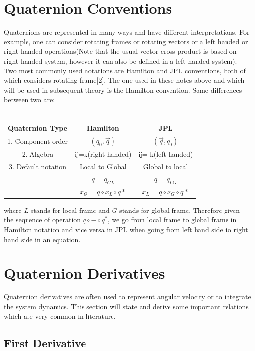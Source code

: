 \documentclass{article}
\begin{document}
	
	\section{Quaternion Conventions}
	Quaternions are represented in many ways and have different interpretations. For example, one can consider rotating frames or rotating vectors or a left handed or right handed operations(Note that the usual vector cross product is based on right handed system, however it can also be defined in a left handed system). Two most commonly used notations are Hamilton and JPL conventions, both of which considers rotating frame[2]. The one used in these notes above and which will be used in subsequent theory is the Hamilton convention. Some differences between two are:\\ \\
	
	\begin{table}
		\centering
		\begin{tabular}{c|c|c}
			Quaternion Type & Hamilton & JPL \\
			\hline
			1. Component order & $ (q_0,\vec{q}) $ & $ (\vec{q},q_0) $\\
			2. Algebra & ij=k(right handed) & ij=-k(left handed)\\
			3. Default notation & Local to Global & Global to local \\
			  & $ q = q_{GL} $ & $ q=q_{LG} $ \\
			  & $ x_G = q\circ x_L\circ q* $ &$  x_L = q\circ x_G \circ q* $\\
			  \hline
		\end{tabular}
	\end{table}
	where $L$ stands for local frame and $G$ stands for global frame. Therefore given the sequence of operation $q\circ - \circ q^*$, we go from local frame to global frame in Hamilton notation and vice versa in JPL when going from left hand side to right hand side in an equation. 
	
	\section{Quaternion Derivatives}
	
	Quaternion derivatives are often used to represent angular velocity or to integrate the system dynamics. This section will state and derive some important relations which are very common in literature.
	
	\subsection{First Derivative}
	
\end{document}
